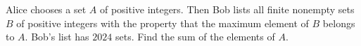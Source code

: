 Alice chooses a set $A$ of positive integers. Then Bob lists all finite nonempty sets $B$ of positive integers with the property that the maximum element of $B$ belongs to $A$. Bob's list has $2024$ sets. Find the sum of the elements of $A$.

